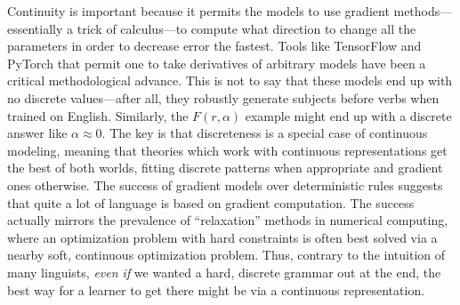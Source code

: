 \documentclass[output=paper,colorlinks,citecolor=brown
]{langscibook}
\begin{document}
Continuity is important because it permits the models to use gradient methods---essentially a trick of calculus---to compute what direction to change all the parameters in order to decrease error the fastest. Tools like TensorFlow and PyTorch that permit one to take derivatives of arbitrary models have been a critical methodological advance. This is not to say that these models end up with no discrete values---after all, they robustly generate subjects before verbs when trained on English. Similarly, the $F(r,\alpha)$ example might end up with a discrete answer like $\alpha \approx 0$. The key is that discreteness is a special case of continuous modeling, meaning that theories which work with continuous representations get the best of both worlds, fitting discrete patterns when appropriate and gradient ones otherwise. The success of gradient models over deterministic rules suggests that quite a lot of language is based on gradient computation. The success actually mirrors the prevalence of ``relaxation'' methods in numerical computing, where an optimization problem with hard constraints is often best solved via a nearby soft, continuous optimization problem. Thus, contrary to the intuition of many linguists, \emph{even if} we wanted a hard, discrete grammar out at the end, the best way for a learner to get there might be via a continuous representation.



\end{document}
